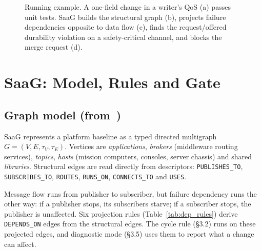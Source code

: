 \documentclass[sigconf,screen]{acmart}
\begin{document}
\begin{figure}[t]
\caption{Running example. A one-field change in a writer's QoS (a) passes unit tests. SaaG builds the structural graph (b), projects failure dependencies opposite to data flow (c), finds the request/offered durability violation on a safety-critical channel, and blocks the merge request (d).}
\label{fig:example}
\end{figure}

\section{SaaG: Model, Rules and Gate}

\subsection{Graph model (from~\cite{yigit2025graph})}
SaaG represents a platform baseline as a typed directed multigraph $G=(V,E,\tau_V,\tau_E)$. Vertices are \emph{applications}, \emph{brokers} (middleware routing services), \emph{topics}, \emph{hosts} (mission computers, consoles, server chassis) and shared \emph{libraries}. Structural edges are read directly from descriptors: \texttt{PUBLISHES\_TO}, \texttt{SUBSCRIBES\_TO}, \texttt{ROUTES}, \texttt{RUNS\_ON}, \texttt{CONNECTS\_TO} and \texttt{USES}.

Message flow runs from publisher to subscriber, but failure dependency runs the other way: if a publisher stops, its subscribers starve; if a subscriber stops, the publisher is unaffected. Six projection rules (Table~\ref{tab:dep_rules}) derive \texttt{DEPENDS\_ON} edges from the structural edges. The cycle rule (\S3.2) runs on these projected edges, and diagnostic mode (\S3.5) uses them to report what a change can affect.
\end{document}
